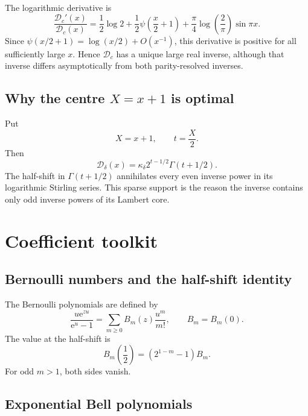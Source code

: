 \documentclass[11pt,oneside]{article}
\theoremstyle{plain}
\theoremstyle{definition}
\theoremstyle{remark}
\newcommand{\e}{\mathrm e}
\newcommand{\DF}{\mathcal D}
\newcommand{\Dc}{\mathcal D_{\!c}}
\begin{document}
The logarithmic derivative is
\begin{equation}
 \frac{\Dc'(x)}{\Dc(x)}
 =\frac12\log2+\frac12\psi\!\left(\frac x2+1\right)
 +\frac\pi4\log\!\left(\frac2\pi\right)\sin\pi x.
 \label{eq:cosine-log-derivative}
\end{equation}
Since \(\psi(x/2+1)=\log(x/2)+O(x^{-1})\), this derivative is positive for all
sufficiently large \(x\).  Hence \(\Dc\) has a unique large real inverse,
although that inverse differs asymptotically from both parity-resolved
inverses.

\subsection{Why the centre \texorpdfstring{\(X=x+1\)}{X=x+1} is optimal}
\label{sec:optimal-centre}

Put
\begin{equation}
 X=x+1,
 \qquad t=\frac X2.
 \label{eq:center-variables}
\end{equation}
Then
\begin{equation}
 \DF_\delta(x)=\kappa_\delta 2^{t-1/2}\Gamma(t+1/2).
 \label{eq:centered-gamma}
\end{equation}
The half-shift in \(\Gamma(t+1/2)\) annihilates every even inverse power in its
logarithmic Stirling series.  This sparse support is the reason the inverse
contains only odd inverse powers of its Lambert core.

\section{Coefficient toolkit}
\label{sec:toolkit}

\subsection{Bernoulli numbers and the half-shift identity}

The Bernoulli polynomials are defined by
\begin{equation}
 \frac{u\e^{zu}}{\e^u-1}
 =\sum_{m\ge0}B_m(z)\frac{u^m}{m!},
 \qquad B_m=B_m(0).
 \label{eq:bernoulli-generating}
\end{equation}
The value at the half-shift is
\begin{equation}
 B_m\!\left(\frac12\right)=(2^{1-m}-1)B_m.
 \label{eq:bernoulli-half}
\end{equation}
For odd \(m>1\), both sides vanish.

\subsection{Exponential Bell polynomials}
\end{document}
